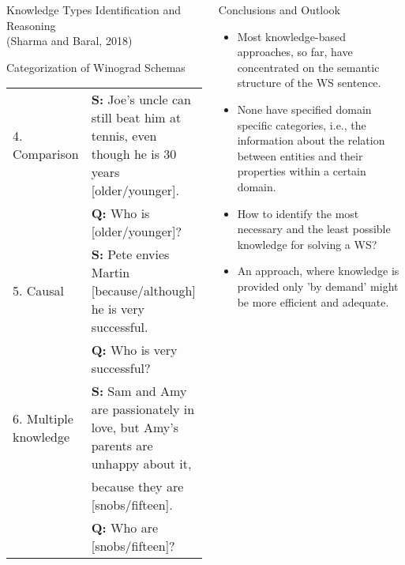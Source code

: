 \documentclass[svgnames, final, 20pt]{beamer} %
\begin{document}
\begin{frame}[fragile]
\begin{columns}[t]
\begin{block}{Knowledge Types Identification and Reasoning\\(Sharma and Baral, 2018)}
\begin{block}{Categorization of Winograd Schemas}
{\begin{tabular}{  l | l  }
		4. Comparison &\textbf{S:} Joe's uncle can still beat him at tennis, even though he is 30 years {\color{myorange}[older/younger]}.\\&\textbf{Q:} Who is [older/younger]?\\ \hline
		
		5. Causal &\textbf{S:} Pete envies Martin {\color{myorange}[because/although]} he is very successful.\\&\textbf{Q:} Who is very successful? \\ \hline 
		
		6. Multiple knowledge &\textbf{S:}  		
		Sam and Amy are passionately in love, but Amy's parents are unhappy about it,\\& because they are {\color{myorange}[snobs/fifteen]}.  \\&\textbf{Q:} Who are [snobs/fifteen]?\\ \hline
	\end{tabular} } 

\end{block}
\end{block}
\vspace{-1.5cm}
\begin{block}{Conclusions and Outlook}
\begin{itemize}
 \item  Most knowledge-based approaches, so far, have concentrated on the semantic structure of the WS sentence. 
\item None have specified domain specific categories, i.e., the information about the relation between entities and their properties within a certain domain.
\item How to identify the most necessary and the least possible knowledge for solving a WS?
\item An approach, where knowledge is provided only 'by demand' might be more efficient and adequate.
 
\end{itemize}
\end{block}


\end{columns}

\end{frame}
\end{document}
